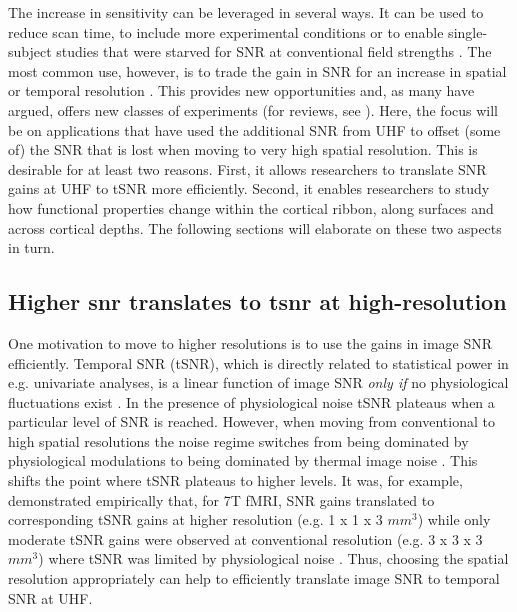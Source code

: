 The increase in sensitivity can be leveraged in several ways. It can be used to reduce scan time, to include more experimental conditions or to enable single-subject studies that were starved for SNR at conventional field strengths \parencite{Polimeni2017}. The most common use, however, is to trade the gain in SNR for an increase in spatial or temporal resolution \parencite{Polimeni2017}. This provides new opportunities and, as many have argued, offers new classes of experiments (for reviews, see \cite{Polimeni2017, DeMartino2016, Dumoulin2017}). Here, the focus will be on applications that have used the additional SNR from UHF to offset (some of) the SNR that is lost when moving to very high spatial resolution. This is desirable for at least two reasons. First, it allows researchers to translate SNR gains at UHF to tSNR more efficiently. Second, it enables researchers to study how functional properties change within the cortical ribbon, along surfaces and across cortical depths. The following sections will elaborate on these two aspects in turn.

\subsection{Higher snr translates to tsnr at high-resolution}
One motivation to move to higher resolutions is to use the gains in image SNR efficiently. Temporal SNR (tSNR), which is directly related to statistical power in e.g. univariate analyses, is a linear function of image SNR \textit{only if} no physiological fluctuations exist \parencite{Murphy2007}. In the presence of physiological noise tSNR plateaus when a particular level of SNR is reached. However, when moving from conventional to high spatial resolutions the noise regime switches from being dominated by physiological modulations to being dominated by thermal image noise \parencite{Triantafyllou2005}. This shifts the point where tSNR plateaus to higher levels. It was, for example, demonstrated empirically that, for 7T fMRI, SNR gains translated to corresponding tSNR gains at higher resolution (e.g. 1 x 1 x 3 $mm^3$) while only moderate tSNR gains were observed at conventional resolution (e.g. 3 x 3 x 3 $mm^3$) where tSNR was limited by physiological noise \parencite{Triantafyllou2005}. Thus, choosing the spatial resolution appropriately can help to efficiently translate image SNR to temporal SNR at UHF.

